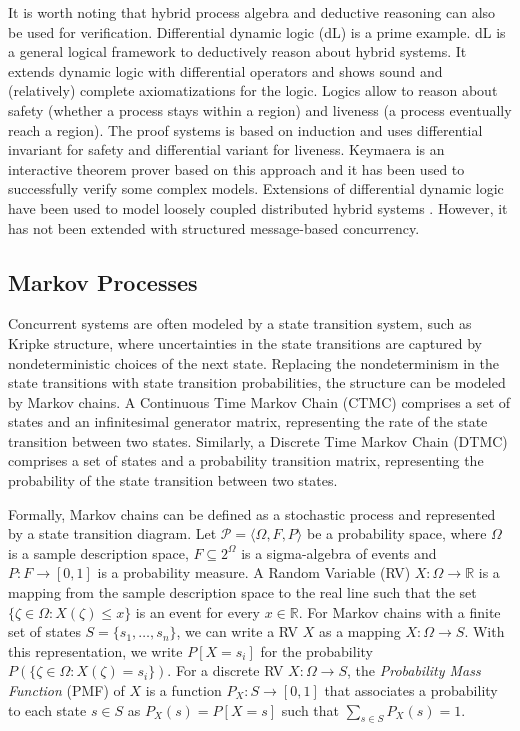\documentclass[
graybox,
envcountchap
]{svmult}
\begin{document}
\begin{bibunit}
It is worth noting that hybrid process algebra and deductive reasoning can also be used for verification.
Differential dynamic logic (dL) \cite{PlatzerBook,Platzer18,PlatzerT18} is a prime example.
dL is a general logical framework to deductively reason about hybrid systems.
It extends dynamic logic with differential operators and shows sound and (relatively) complete axiomatizations for the logic.
Logics allow to reason about safety (whether a process stays within a region) and liveness (a process eventually reach a region).
The proof systems is based on induction and uses differential invariant for safety and differential variant for liveness.
Keymaera \cite{QueselMLAP16} is an interactive theorem prover based on this approach and it has been used to successfully verify some complex models.
Extensions of differential dynamic logic have been used to model loosely coupled distributed hybrid systems \cite{Platzer12}.
However, it has not been extended with structured message-based concurrency.


    \subsection{Markov Processes}

Concurrent systems are often modeled by a state transition system, such as Kripke structure, where uncertainties in the state transitions are captured by nondeterministic choices of the next state. Replacing the nondeterminism in the state transitions with state transition probabilities, the structure can be modeled by Markov chains. A Continuous Time Markov Chain (CTMC) comprises a set of states and an infinitesimal generator matrix, representing the rate of the state transition between two states. Similarly, a Discrete Time Markov Chain (DTMC) comprises a set of states and a probability transition matrix, representing the probability of the state transition between two states. 


Formally, Markov chains can be defined as a stochastic process and represented by a state transition diagram. Let $\mathcal{P}=\langle\Omega,F,P\rangle$ be a probability space, where $\Omega$ is a sample description space, $F\subseteq 2^\Omega$ is a sigma-algebra of events and $P:F\rightarrow[0,1]$ is a probability measure. A Random Variable (RV) $X:\Omega\rightarrow\mathbb{R}$ is a mapping from the sample description space to the real line such that the set $\{\zeta\in\Omega:X(\zeta)\leq x\}$ is an event for every $x\in\mathbb{R}$. For Markov chains with a finite set of states $S=\{s_1,\ldots,s_n\}$, we can write a RV $X$ as a mapping $X:\Omega\rightarrow S$. With this representation, we write $P[X=s_i]$ for the probability $P(\{\zeta\in\Omega:X(\zeta)=s_i\})$. 
For a discrete RV $X:\Omega\rightarrow S$, the {\em Probability Mass Function} (PMF) of $X$ is a function $P_X:S\rightarrow[0,1]$ that associates a probability to each state $s\in S$ as $P_X(s)=P[X=s]$ such that $\sum_{s\in S} P_X(s)=1$.



\end{bibunit}
\end{document}
